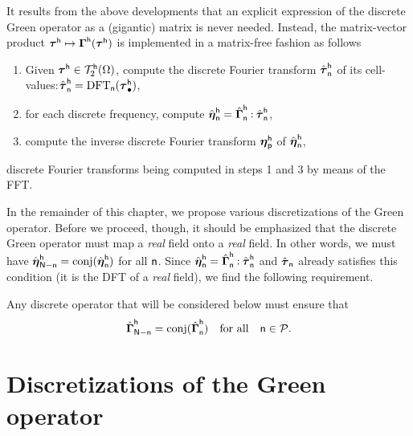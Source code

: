 It results from the above developments that an explicit expression of the
discrete Green operator as a (gigantic) matrix is never needed. Instead, the
matrix-vector product
\(\boldsymbol\tau^{\mathsf h}\mapsto\boldsymbol\Gamma^{\mathsf h}(\boldsymbol\tau^{\mathsf h})\) is
implemented in a matrix-free fashion as follows
\begin{enumerate}
\item Given \(\boldsymbol\tau^{\mathsf h}\in\mathcal T_2^{\mathsf h}(\Omega)\), compute
  the discrete Fourier transform \(\hat{\boldsymbol\tau}_{\mathsf n}^{\mathsf h}\) of
  its
  cell-values:\(\hat{\boldsymbol\tau}_{\mathsf n}^{\mathsf h}=\operatorname{DFT}_{\mathsf
    n}(\boldsymbol\tau_\bullet^{\mathsf h})\),
\item for each discrete frequency, compute
  \(\hat{\boldsymbol\eta}_{\mathsf n}^{\mathsf h}=\hat{\boldsymbol\Gamma}_{\mathsf n}^{\mathsf
    h}\mathbin{\mathord{:}}\hat{\boldsymbol\tau}_{\mathsf n}^{\mathsf h}\),
\item compute the inverse discrete Fourier transform
  \(\boldsymbol\eta_{\mathsf{p}}^{\mathsf h}\) of
  \(\hat{\boldsymbol\eta}_{\mathsf{n}}^{\mathsf h}\),
\end{enumerate}
discrete Fourier transforms being computed in steps 1 and 3 by means of the FFT.

\begin{remark}
  \label{rem:20210928060531}
  In the remainder of this chapter, we propose various discretizations of the
  Green operator. Before we proceed, though, it should be emphasized that the
  discrete Green operator must map a \emph{real} field onto a \emph{real}
  field. In other words, we must have
  \(\hat{\boldsymbol\eta}_{\mathsf N-\mathsf n}^{\mathsf h}=\operatorname{conj}(\hat{\boldsymbol\eta}_{\mathsf
    n}^{\mathsf h})\) for all \(\mathsf n\). Since
  \(\hat{\boldsymbol\eta}_{\mathsf n}^{\mathsf h} =\hat{\boldsymbol\Gamma}_{\mathsf n}^{\mathsf
    h}\mathbin{\mathord{:}}\hat{\boldsymbol\tau}_{\mathsf n}^{\mathsf h}\) and
  \(\hat{\boldsymbol\tau}_{\mathsf n}\) already satisfies this condition (it is the DFT
  of a \emph{real} field), we find the following requirement.

  Any discrete operator that will be considered below must ensure that
  \begin{equation}
    \hat{\boldsymbol\Gamma}_{\mathsf N-\mathsf n}^{\mathsf h}
    =\operatorname{conj}(\hat{\boldsymbol\Gamma}_{\mathsf n}^{\mathsf h})
    \quad\text{for all}\quad\mathsf n\in\mathcal{P}.
  \end{equation}
\end{remark}


\section{Discretizations of the Green operator}

